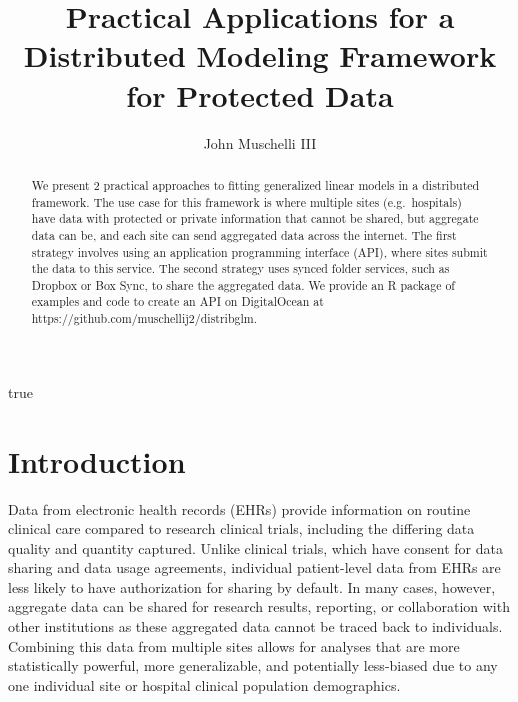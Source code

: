 \documentclass[]{elsarticle} %
\begin{document}
\begin{frontmatter}

  \title{Practical Applications for a Distributed Modeling Framework for Protected Data}
    \author[Johns Hopkins Bloomberg School of Public Health]{John Muschelli III}
      \address[Johns Hopkins Bloomberg School of Public Health]{Department of Biostatistics, 615 N Wolfe St, Baltimore MD, 21205}
    
  \begin{abstract}
  We present 2 practical approaches to fitting generalized linear models in a distributed framework. The use case for this framework is where multiple sites (e.g.~hospitals) have data with protected or private information that cannot be shared, but aggregate data can be, and each site can send aggregated data across the internet. The first strategy involves using an application programming interface (API), where sites submit the data to this service. The second strategy uses synced folder services, such as Dropbox or Box Sync, to share the aggregated data. We provide an R package of examples and code to create an API on DigitalOcean at https://github.com/muschellij2/distribglm.
  \end{abstract}
   \begin{keyword} true\end{keyword}
 \end{frontmatter}

\hypertarget{introduction}{%
\section{Introduction}\label{introduction}}

Data from electronic health records (EHRs) provide information on routine clinical care compared to research clinical trials, including the differing data quality and quantity captured. Unlike clinical trials, which have consent for data sharing and data usage agreements, individual patient-level data from EHRs are less likely to have authorization for sharing by default. In many cases, however, aggregate data can be shared for research results, reporting, or collaboration with other institutions as these aggregated data cannot be traced back to individuals. Combining this data from multiple sites allows for analyses that are more statistically powerful, more generalizable, and potentially less-biased due to any one individual site or hospital clinical population demographics.
\end{document}
